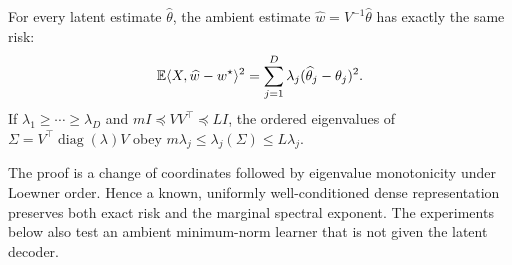 \begin{proposition}
\label{prop:dense}
For every latent estimate $\widehat\theta$, the ambient estimate
$\widehat w=V^{-1}\widehat\theta$ has exactly the same risk:
\begin{equation}
\mathbb{E}\langle X,\widehat w-w^\star\rangle^2
=\sum_{j=1}^D\lambda_j(\widehat\theta_j-\theta_j)^2.
\label{eq:dense-risk}
\end{equation}
If $\lambda_1\ge\cdots\ge\lambda_D$ and
$mI\preceq VV^\top\preceq LI$, the ordered eigenvalues of
$\Sigma=V^\top\operatorname{diag}(\lambda)V$ obey
$m\lambda_j\le\lambda_j(\Sigma)\le L\lambda_j$.
\end{proposition}
The proof is a change of coordinates followed by eigenvalue monotonicity under
Loewner order.  Hence a known, uniformly well-conditioned dense representation
preserves both exact risk and the marginal spectral exponent.  The
experiments below also test an ambient minimum-norm learner that is not given
the latent decoder.
